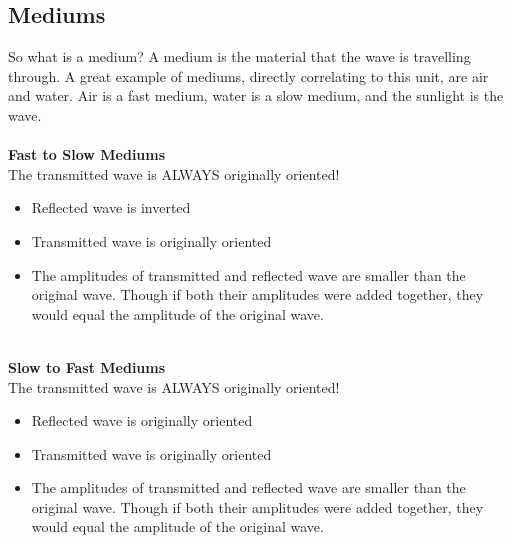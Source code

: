 \documentclass{article}
\begin{document}
\subsection{Mediums}
So what is a medium? A medium is the material that the wave is travelling through. A great example of mediums, directly correlating to this unit, are air and water. Air is a fast medium, water is a slow medium, and the sunlight is the wave.\\\\
\textbf{Fast to Slow Mediums}\\
The transmitted wave is ALWAYS originally oriented!
\begin{itemize}
    \item Reflected wave is inverted
    \item Transmitted wave is originally oriented
    \item The amplitudes of transmitted and reflected wave are smaller than the original wave. Though if both their amplitudes were added together, they would equal the amplitude of the original wave.
\end{itemize}\leavevmode\\
\textbf{Slow to Fast Mediums}\\
The transmitted wave is ALWAYS originally oriented!
\begin{itemize}
    \item Reflected wave is originally oriented
    \item Transmitted wave is originally oriented
    \item The amplitudes of transmitted and reflected wave are smaller than the original wave. Though if both their amplitudes were added together, they would equal the amplitude of the original wave.
\end{itemize}\leavevmode
\end{document}
